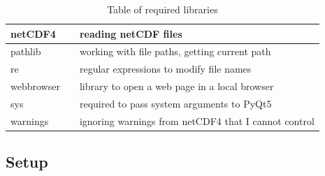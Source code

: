 \documentclass[../00_main.tex]{subfiles}
\begin{document}
\begin{table}[H]
\begin{tabular}{| l | l | l |}
                                        \\\hline
    netCDF4     & \cite{netcdf4}    & reading netCDF files
                                        \\\hline
    pathlib     & \cite{pathlib}    & working with file paths, getting current 
                                        path\\\hline
    re          & \cite{py-re}      & regular expressions to modify file names
                                        \\\hline
    webbrowser  & \cite{browser}    & library to open a web page in a local 
                                        browser\\\hline
    sys         & \cite{py-sys}     & required to pass system arguments to 
                                        PyQt5\\\hline
    warnings    & \cite{warnings}   & ignoring warnings from netCDF4 that I 
                                        cannot control\\\hline
\end{tabular}
    \caption{Table of required libraries}
    \label{tab:01}
\end{table}

\subsection{Setup}
\end{document}

